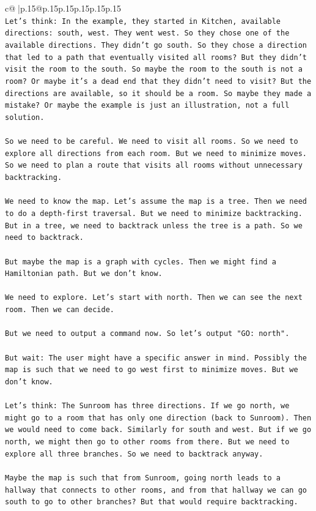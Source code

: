 \documentclass{article}
\begin{document}
{\begin{supertabular}{c@{$\;$}|p{.15\linewidth}@{}p{.15\linewidth}p{.15\linewidth}p{.15\linewidth}p{.15\linewidth}p{.15\linewidth}}
{{{\\ 
\texttt{Let's think: In the example, they started in Kitchen, available directions: south, west. They went west. So they chose one of the available directions. They didn't go south. So they chose a direction that led to a path that eventually visited all rooms? But they didn't visit the room to the south. So maybe the room to the south is not a room? Or maybe it's a dead end that they didn't need to visit? But the directions are available, so it should be a room. So maybe they made a mistake? Or maybe the example is just an illustration, not a full solution.} \\
\\ 
\texttt{So we need to be careful. We need to visit all rooms. So we need to explore all directions from each room. But we need to minimize moves. So we need to plan a route that visits all rooms without unnecessary backtracking.} \\
\\ 
\texttt{We need to know the map. Let's assume the map is a tree. Then we need to do a depth{-}first traversal. But we need to minimize backtracking. But in a tree, we need to backtrack unless the tree is a path. So we need to backtrack.} \\
\\ 
\texttt{But maybe the map is a graph with cycles. Then we might find a Hamiltonian path. But we don't know.} \\
\\ 
\texttt{We need to explore. Let's start with north. Then we can see the next room. Then we can decide.} \\
\\ 
\texttt{But we need to output a command now. So let's output "GO: north".} \\
\\ 
\texttt{But wait: The user might have a specific answer in mind. Possibly the map is such that we need to go west first to minimize moves. But we don't know.} \\
\\ 
\texttt{Let's think: The Sunroom has three directions. If we go north, we might go to a room that has only one direction (back to Sunroom). Then we would need to come back. Similarly for south and west. But if we go north, we might then go to other rooms from there. But we need to explore all three branches. So we need to backtrack anyway.} \\
\\ 
\texttt{Maybe the map is such that from Sunroom, going north leads to a hallway that connects to other rooms, and from that hallway we can go south to go to other branches? But that would require backtracking.} \\
}}}
\end{supertabular}}
\end{document}
